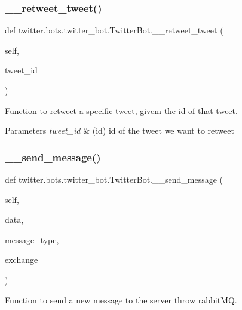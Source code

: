 \subsubsection{\texorpdfstring{\+\_\+\+\_\+retweet\+\_\+tweet()}{\_\_retweet\_tweet()}}
{\footnotesize\ttfamily def twitter.\+bots.\+twitter\+\_\+bot.\+Twitter\+Bot.\+\_\+\+\_\+retweet\+\_\+tweet (\begin{DoxyParamCaption}\item[{}]{self,  }\item[{}]{tweet\+\_\+id }\end{DoxyParamCaption})\hspace{0.3cm}{\ttfamily [private]}}



Function to retweet a specific tweet, givem the id of that tweet. 


\begin{DoxyParams}{Parameters}
{\em tweet\+\_\+id} & (id) id of the tweet we want to retweet \\
\hline
\end{DoxyParams}
\mbox{\label{classtwitter_1_1bots_1_1twitter__bot_1_1TwitterBot_ae40a4a851aab620149c9e07364eeb03e}} 
\subsubsection{\texorpdfstring{\+\_\+\+\_\+send\+\_\+message()}{\_\_send\_message()}}
{\footnotesize\ttfamily def twitter.\+bots.\+twitter\+\_\+bot.\+Twitter\+Bot.\+\_\+\+\_\+send\+\_\+message (\begin{DoxyParamCaption}\item[{}]{self,  }\item[{}]{data,  }\item[{}]{message\+\_\+type,  }\item[{}]{exchange }\end{DoxyParamCaption})\hspace{0.3cm}{\ttfamily [private]}}



Function to send a new message to the server throw rabbit\+MQ. 


